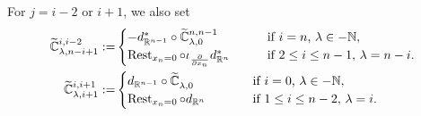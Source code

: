 For $j=i-2$ or $i+1$, 
 we also set 
\begin{align*}
\widetilde{{\mathbb{C}}}_{{\lambda},{n-i+1}}^{{i,i-2}}
:=&
\begin{cases}
- d_{\mathbb{R}^{n-1}}^{\ast} \circ \widetilde{{\mathbb{C}}}_{{\lambda},{0}}^{{n,n-1}}
&\text{if $i=n$, $\lambda \in -{\mathbb{N}}$}, 
\\
\operatorname{Rest}_{x_n=0}
\circ 
\iota_{\frac{\partial}{\partial x_n}} 
d_{\mathbb{R}^{n}}^{\ast}
\qquad
&\text{if $2 \le i \le n-1$, $\lambda = n-i$}.   
\end{cases}
\\
\widetilde{{\mathbb{C}}}_{{\lambda},{i+1}}^{{i,i+1}}
:=&
\begin{cases}
d_{{\mathbb{R}}^{n-1}}
\circ 
\widetilde{{\mathbb{C}}}_{{\lambda},{0}}^{{}}
\qquad\hspace{6mm}
&\text{if $i=0$, $\lambda  \in -{\mathbb{N}}$}, 
\\
\operatorname{Rest}_{x_n=0}
\circ 
d_{\mathbb{R}^{n}}
&\text{if $1 \le i \le n-2$, $\lambda=i$}.  
\end{cases}
\end{align*}



